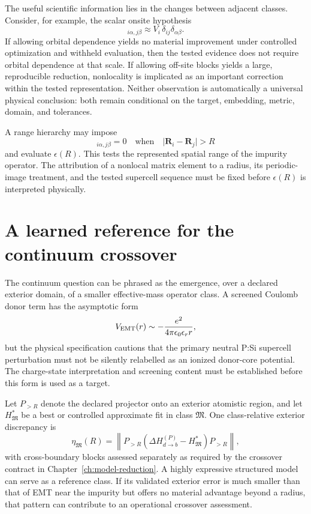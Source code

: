 The useful scientific information lies in the changes between adjacent
classes. Consider, for example, the scalar onsite hypothesis
\begin{equation}
  [\Delta H]_{i\alpha,j\beta}
  \approx
  V_i\,\delta_{ij}\delta_{\alpha\beta}.
  \label{eq:scalar-onsite-hypothesis}
\end{equation}
If allowing orbital dependence yields no material improvement under controlled
optimization and withheld evaluation, then the tested evidence does not require
orbital dependence at that scale. If allowing off-site blocks yields a large,
reproducible reduction, nonlocality is implicated as an important correction
within the tested representation. Neither observation is automatically a
universal physical conclusion: both remain conditional on the target,
embedding, metric, domain, and tolerances.

A range hierarchy may impose
\begin{equation}
  [\Delta H]_{i\alpha,j\beta}=0
  \quad\text{when}\quad
  \lvert\mathbf R_i-\mathbf R_j\rvert>R
\end{equation}
and evaluate $\epsilon(R)$. This tests the represented spatial range of the
impurity operator. The attribution of a nonlocal matrix element to a radius,
its periodic-image treatment, and the tested supercell sequence must be fixed
before $\epsilon(R)$ is interpreted physically.

\section{A learned reference for the continuum crossover}

The continuum question can be phrased as the emergence, over a declared
exterior domain, of a smaller effective-mass operator class. A screened
Coulomb donor term has the asymptotic form
\begin{equation}
  V_{\rm EMT}(r)
  \sim
  -\frac{e^2}{4\pi\epsilon_0\epsilon_r r},
\end{equation}
but the physical specification cautions that the primary neutral P:Si
supercell perturbation must not be silently relabelled as an ionized donor-core
potential. The charge-state interpretation and screening content must be
established before this form is used as a target.

Let $P_{>R}$ denote the declared projector onto an exterior atomistic region,
and let $H_{\mathfrak M}^{\ast}$ be a best or controlled approximate fit in
class $\mathfrak M$. One class-relative exterior discrepancy is
\begin{equation}
  \eta_{\mathfrak M}(R)
  =
  \left\|
    P_{>R}
    \left(\Delta H_{d\to b}^{(P)}-H_{\mathfrak M}^{\ast}\right)
    P_{>R}
  \right\|,
  \label{eq:class-exterior-error}
\end{equation}
with cross-boundary blocks assessed separately as required by the crossover
contract in Chapter~\ref{ch:model-reduction}. A highly expressive structured
model can serve as a reference class. If its validated exterior error is much
smaller than that of EMT near the impurity but offers no material advantage
beyond a radius, that pattern can contribute to an operational crossover
assessment.

